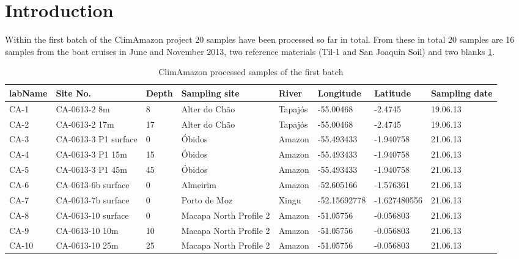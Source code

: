 \section{Introduction}
Within the first batch of the ClimAmazon project 20 samples have been processed so far in total. 
From these in total 20 samples are 16 samples from the boat cruises in June and November 2013, two reference materials (Til-1 and San Joaquin Soil) and two blanks \ref{tab:CA_samples}.

\begin{table}[h]
\centering
\caption{ClimAmazon processed samples of the first batch}
\label{tab:CA_samples}
\begin{tabular}{|l|l|l|l|l|l|l|l|}
\hline
labName & Site No.             & Depth & Sampling site          & River   & Longitude    & Latitude     & Sampling date \\ \hline
CA-1    & CA-0613-2 8m         & 8     & Alter do Chão          & Tapajós & -55.00468    & -2.4745      & 19.06.13      \\ \hline
CA-2    & CA-0613-2  17m       & 17    & Alter do Chão          & Tapajós & -55.00468    & -2.4745      & 19.06.13      \\ \hline
CA-3    & CA-0613-3 P1 surface & 0     & Óbidos                 & Amazon  & -55.493433   & -1.940758    & 21.06.13      \\ \hline
CA-4    & CA-0613-3 P1 15m     & 15    & Óbidos                 & Amazon  & -55.493433   & -1.940758    & 21.06.13      \\ \hline
CA-5    & CA-0613-3 P1 45m     & 45    & Óbidos                 & Amazon  & -55.493433   & -1.940758    & 21.06.13      \\ \hline
CA-6    & CA-0613-6b surface   & 0     & Almeirim               & Amazon  & -52.605166   & -1.576361    & 21.06.13      \\ \hline
CA-7    & CA-0613-7b surface   & 0     & Porto de Moz           & Xingu   & -52.15692778 & -1.627480556 & 21.06.13      \\ \hline
CA-8    & CA-0613-10  surface  & 0     & Macapa North Profile 2 & Amazon  & -51.05756    & -0.056803    & 21.06.13      \\ \hline
CA-9    & CA-0613-10  10m      & 10    & Macapa North Profile 2 & Amazon  & -51.05756    & -0.056803    & 21.06.13      \\ \hline
CA-10   & CA-0613-10  25m      & 25    & Macapa North Profile 2 & Amazon  & -51.05756    & -0.056803    & 21.06.13      \\ \hline

\end{tabular}
\end{table}
